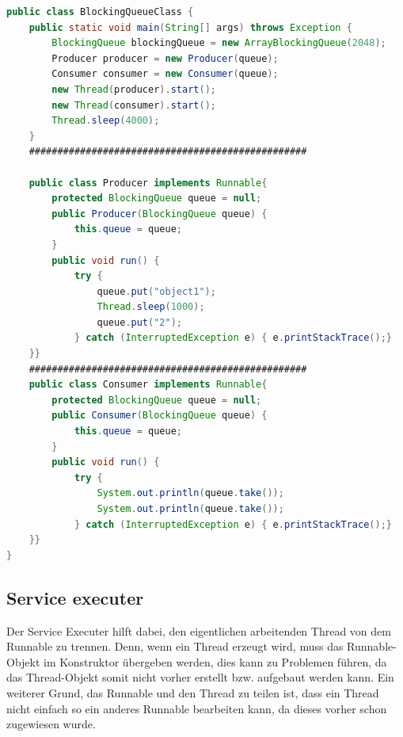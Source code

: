 \begin{lstlisting}[language=java,caption=Java BlockingQueue Beispiel,label=lst:impl:blockingQueue]
    public class BlockingQueueClass {
    public static void main(String[] args) throws Exception {
        BlockingQueue blockingQueue = new ArrayBlockingQueue(2048);
        Producer producer = new Producer(queue);
        Consumer consumer = new Consumer(queue);
        new Thread(producer).start();
        new Thread(consumer).start();
        Thread.sleep(4000);
    }
    #################################################

    public class Producer implements Runnable{
        protected BlockingQueue queue = null;
        public Producer(BlockingQueue queue) {
            this.queue = queue;
        }
        public void run() {
            try {
                queue.put("object1");
                Thread.sleep(1000);
                queue.put("2");
            } catch (InterruptedException e) { e.printStackTrace();}
    }}
    #################################################
    public class Consumer implements Runnable{
        protected BlockingQueue queue = null;
        public Consumer(BlockingQueue queue) {
            this.queue = queue;
        }
        public void run() {
            try {
                System.out.println(queue.take());
                System.out.println(queue.take());
            } catch (InterruptedException e) { e.printStackTrace();}
    }}
}
\end{lstlisting}

\subsection{Service executer}
Der Service Executer hilft dabei, den eigentlichen arbeitenden Thread von dem Runnable zu trennen. Denn, wenn ein Thread erzeugt wird, muss das Runnable-Objekt im Konstruktor übergeben werden, dies kann zu Problemen führen, da das Thread-Objekt somit nicht vorher erstellt bzw. aufgebaut werden kann. Ein weiterer Grund, das Runnable und den Thread zu teilen ist, dass ein Thread nicht einfach so ein anderes Runnable bearbeiten kann, da dieses vorher schon zugewiesen wurde. 




